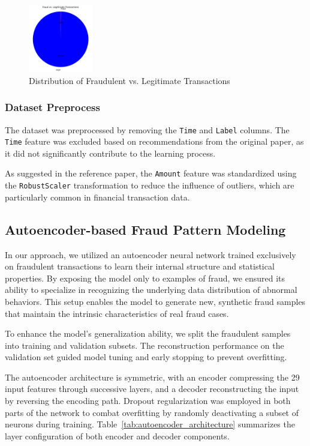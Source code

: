 \begin{figure}[h]
    \centering
    \includegraphics[width=0.25\textwidth]{images/fraud_vs_legit_pie.png}
    \caption{Distribution of Fraudulent vs. Legitimate Transactions}
    \label{fig:class-distribution}
\end{figure}

\subsubsection{Dataset Preprocess}
The dataset was preprocessed by removing the \texttt{Time} and \texttt{Label} columns. The \texttt{Time} feature was excluded based on recommendations from the original paper, as it did not significantly contribute to the learning process.

As suggested in the reference paper, the \texttt{Amount} feature was standardized using the \texttt{RobustScaler} transformation to reduce the influence of outliers, which are particularly common in financial transaction data.

\subsection{Autoencoder-based Fraud Pattern Modeling}
In our approach, we utilized an autoencoder neural network trained exclusively on fraudulent transactions to learn their internal structure and statistical properties. By exposing the model only to examples of fraud, we ensured its ability to specialize in recognizing the underlying data distribution of abnormal behaviors. This setup enables the model to generate new, synthetic fraud samples that maintain the intrinsic characteristics of real fraud cases.

To enhance the model’s generalization ability, we split the fraudulent samples into training and validation subsets. The reconstruction performance on the validation set guided model tuning and early stopping to prevent overfitting.

The autoencoder architecture is symmetric, with an encoder compressing the 29 input features through successive layers, and a decoder reconstructing the input by reversing the encoding path. Dropout regularization was employed in both parts of the network to combat overfitting by randomly deactivating a subset of neurons during training. Table~\ref{tab:autoencoder_architecture} summarizes the layer configuration of both encoder and decoder components.

